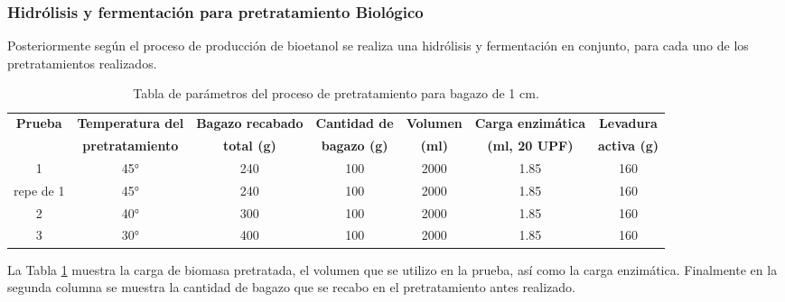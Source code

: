 \documentclass[12pt]{article}
\begin{document}
	
	
	
	
	

		
			
			
   	\subsubsection{ Hidrólisis y fermentación para pretratamiento Biológico}
   
   Posteriormente según el proceso de producción de bioetanol se realiza una hidrólisis y fermentación en conjunto, para cada uno de los pretratamientos realizados.
   
\begin{table}[H]
	\centering
	\caption{Tabla de parámetros del proceso de pretratamiento para bagazo de 1 cm.}
	\label{biolo parte 3}
	\resizebox{16cm}{!} {
	\begin{tabular}{|c|c|c|c|c|c|c|}
		\hline
	\textbf{Prueba}	& \textbf{Temperatura del} & \textbf{Bagazo recabado} & \textbf{Cantidad de} & \textbf{Volumen} & \textbf{Carga enzimática} & \textbf{Levadura} \\
	&	\textbf{pretratamiento} & \textbf{total (g)} & \textbf{bagazo (g)} & \textbf{(ml)} & \textbf{(ml, 20 UPF)} & \textbf{activa (g)} \\ \hline		
1	&	45° & 240 & 100 & 2000 & 1.85 & 160 \\ \hline
repe de 1&	45° & 240 & 100 & 2000 & 1.85 & 160 \\ \hline
2	&	40° & 300 & 100 & 2000 & 1.85 & 160 \\ \hline
3	&	30° & 400 & 100 & 2000 & 1.85 & 160 \\ \hline
	\end{tabular} }
	
\end{table}

  La Tabla \ref{biolo parte 3} muestra la carga de biomasa pretratada, el volumen que se utilizo en la prueba, así como la carga enzimática. Finalmente en la segunda columna se muestra la cantidad de bagazo que se recabo en el pretratamiento antes realizado. 
\end{document}
